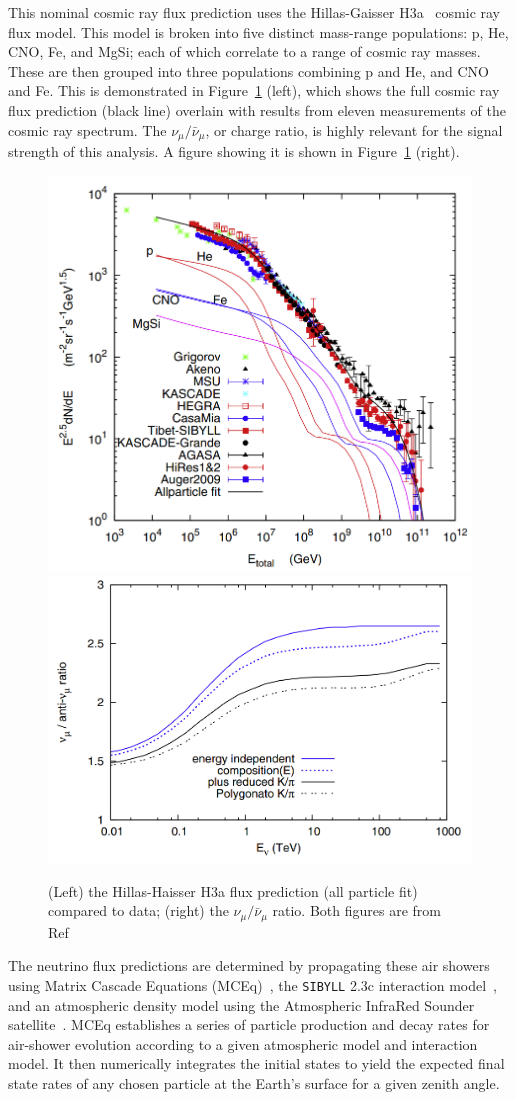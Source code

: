 \documentclass[main.tex]{subfiles}
\begin{document}
This nominal cosmic ray flux prediction uses the Hillas-Gaisser H3a~\cite{GAISSER2012801} cosmic ray flux model. 
This model is broken into five distinct mass-range populations: p, He, CNO, Fe, and MgSi; each of which correlate to a range of cosmic ray masses. 
These are then grouped into three populations combining p and He, and CNO and Fe.
This is demonstrated in Figure~\ref{fig:hillas} (left), which shows the full cosmic ray flux prediction (black line) overlain with results from eleven measurements of the cosmic ray spectrum. 
The $\nu_{\mu}/\bar{\nu}_{\mu}$, or charge ratio, is highly relevant for the signal strength of this analysis. 
A figure showing it is shown in Figure~\ref{fig:hillas} (right). 

\begin{figure}
    \centering
    \includegraphics[width=0.45\linewidth]{figures/hillas_flux.png}
    \includegraphics[width=0.45\linewidth]{figures/gaisser_charge_ratio.png}
    \caption{(Left) the Hillas-Haisser H3a flux prediction (all particle fit) compared to data; (right) the $\nu_{\mu}/\bar{\nu}_{\mu}$ ratio. Both figures are from Ref~\cite{GAISSER2012801}}\label{fig:hillas}
\end{figure}

The neutrino flux predictions are determined by propagating these air showers using Matrix Cascade Equations (MCEq)~\cite{fedynitch2015calculation}, the \texttt{SIBYLL} 2.3c interaction model~\cite{Riehn:2017mfm}, and an atmospheric density model using the Atmospheric InfraRed Sounder satellite~\cite{airs_ref}. 
MCEq establishes a series of particle production and decay rates for air-shower evolution according to a given atmospheric model and interaction model. 
It then numerically integrates the initial states to yield the expected final state rates of any chosen particle at the Earth's surface for a given zenith angle. 
\end{document}
